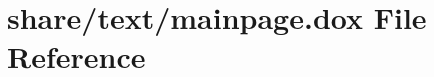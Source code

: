 \hypertarget{mainpage_8dox}{}\section{share/text/mainpage.dox File Reference}
\label{mainpage_8dox}

